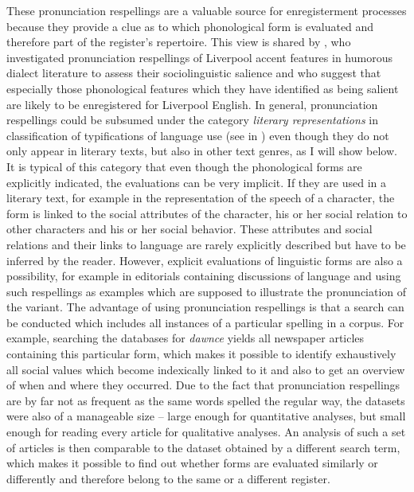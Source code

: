 These pronunciation respellings are a valuable source for enregisterment processes because they provide a clue as to which phonological form is evaluated and therefore part of the register’s repertoire. This view is shared by \citet[335]{Honeybone2013}, who investigated pronunciation respellings of Liverpool accent features in humorous dialect literature to assess their sociolinguistic salience and who suggest that especially those phonological features which they have identified as being salient are likely to be enregistered for Liverpool English. In general, pronunciation respellings could be subsumed under the category \emph{literary representations} in  classification of typifications of language use (see  in ) even though they do not only appear in literary texts, but also in other text genres, as I will show below. It is typical of this category that even though the phonological forms are explicitly indicated, the evaluations can be very implicit. If they are used in a literary text, for example in the representation of the speech of a character, the form is linked to the social attributes of the character, his or her social relation to other characters and his or her social behavior. These attributes and social relations and their links to language are rarely explicitly described but have to be inferred by the reader. However, explicit evaluations of linguistic forms are also a possibility, for example in editorials containing discussions of language and using such respellings as examples which are supposed to illustrate the pronunciation of the variant. The advantage of using pronunciation respellings is that a search can be conducted which includes all instances of a particular spelling in a corpus. For example, searching the databases for \emph{dawnce} yields all newspaper articles containing this particular form, which makes it possible to identify exhaustively all social values which become indexically linked to it and also to get an overview of when and where they occurred. Due to the fact that pronunciation respellings are by far not as frequent as the same words spelled the regular way, the datasets were also of a manageable size – large enough for quantitative analyses, but small enough for reading every article for qualitative analyses. An analysis of such a set of articles is then comparable to the dataset obtained by a different search term, which makes it possible to find out whether forms are evaluated similarly or differently and therefore belong to the same or a different register.

